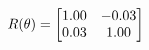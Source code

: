 \documentclass[preview]{standalone}
\begin{document}
\begin{align*}
\special{dvisvgm:raw <g id='unique000'>}R(\theta) = \begin{bmatrix}1.00 & -0.03\\0.03 & 1.00\end{bmatrix}\special{dvisvgm:raw </g>}
\end{align*}
\end{document}
